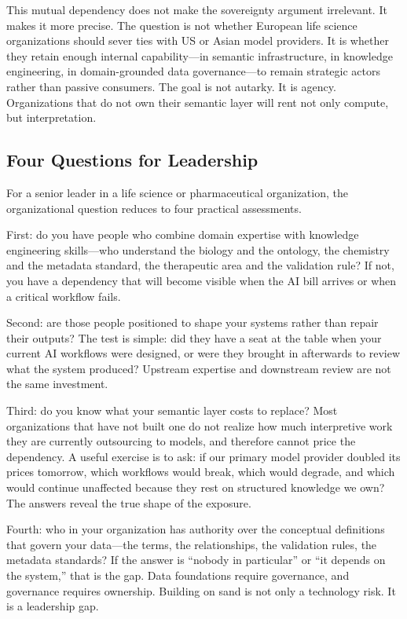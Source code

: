 \documentclass[man,12pt,donotrepeattitle]{apa7}
\begin{document}
This mutual dependency does not make the sovereignty argument irrelevant.
It makes it more precise. The question is not whether European life science
organizations should sever ties with US or Asian model providers. It is
whether they retain enough internal capability---in semantic infrastructure,
in knowledge engineering, in domain-grounded data governance---to remain
strategic actors rather than passive consumers. The goal is not autarky. It
is agency. Organizations that do not own their semantic layer will rent not
only compute, but interpretation.

\subsection{Four Questions for Leadership}

For a senior leader in a life science or pharmaceutical organization, the
organizational question reduces to four practical assessments.

First: do you have people who combine domain expertise with knowledge
engineering skills---who understand the biology and the ontology, the
chemistry and the metadata standard, the therapeutic area and the validation
rule? If not, you have a dependency that will become visible when the AI
bill arrives or when a critical workflow fails.

Second: are those people positioned to shape your systems rather than repair
their outputs? The test is simple: did they have a seat at the table when
your current AI workflows were designed, or were they brought in afterwards
to review what the system produced? Upstream expertise and downstream review
are not the same investment.

Third: do you know what your semantic layer costs to replace? Most
organizations that have not built one do not realize how much interpretive
work they are currently outsourcing to models, and therefore cannot price
the dependency. A useful exercise is to ask: if our primary model provider
doubled its prices tomorrow, which workflows would break, which would
degrade, and which would continue unaffected because they rest on structured
knowledge we own? The answers reveal the true shape of the exposure.

Fourth: who in your organization has authority over the conceptual
definitions that govern your data---the terms, the relationships, the
validation rules, the metadata standards? If the answer is ``nobody in
particular'' or ``it depends on the system,'' that is the gap. Data
foundations require governance, and governance requires ownership. Building
on sand is not only a technology risk. It is a leadership gap.
\end{document}
